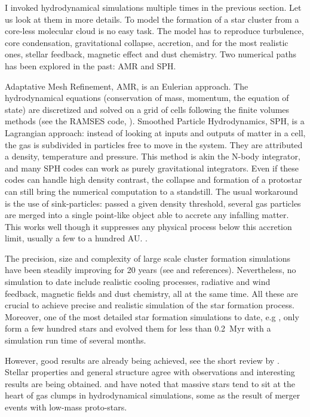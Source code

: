I invoked hydrodynamical simulations multiple times in the previous section. Let us look at them in more details. To model the formation of a star cluster from a core-less molecular cloud is no easy task. The model has to reproduce turbulence, core condensation, gravitational collapse, accretion, and for the most realistic ones, stellar feedback, magnetic effect and dust chemistry. Two numerical paths has been explored in the past: AMR and SPH.

Adaptative Mesh Refinement, AMR, is an Eulerian approach. The hydrodynamical equations (conservation of mass, momentum, the equation of state) are discretized and solved on a grid of cells following the finite volumes methods (see the RAMSES code, \citealt{Teyssier2002}). Smoothed Particle Hydrodynamics, SPH, is a Lagrangian approach: instead of looking at inputs and outputs of matter in a cell, the gas is subdivided in particles free to move in the system. They are attributed a density, temperature and pressure. This method is akin the N-body integrator, and many SPH codes can work as purely gravitational integrators. Even if these codes can handle high density contrast, the collapse and formation of a protostar can still bring the numerical computation to a standstill. The usual workaround is the use of sink-particles: passed a given density threshold, several gas particles are merged into a single point-like object able to accrete any infalling matter. This works well though it suppresses any physical process below this accretion limit, usually a few to a hundred AU. \citep{Bate1997}.

The precision, size and complexity of large scale cluster formation simulations have been steadily improving for 20 years (see \citealt{Turner1995,Klessen2000,Bate2003,Offner2009,Myers2014} and references). Nevertheless, no simulation to date include realistic cooling processes, radiative and wind feedback, magnetic fields and dust chemistry, all at the same time. All these are crucial to achieve precise and realistic simulation of the star formation process. Moreover, one of the most detailed star formation simulations to date, e.g \cite{Bate2012}, only form a few hundred stars and evolved them for less than 0.2~Myr with a simulation run time of several months.

However, good results are already being achieved, see the short review by \cite{Clarke2012}. Stellar properties and general structure agree with observations and interesting results are being obtained. \cite{Maschberger2011} and \cite{Moeckel2011} have noted that massive stars tend to sit at the heart of gas clumps in hydrodynamical simulations, some as the result of merger events with low-mass proto-stars. 


